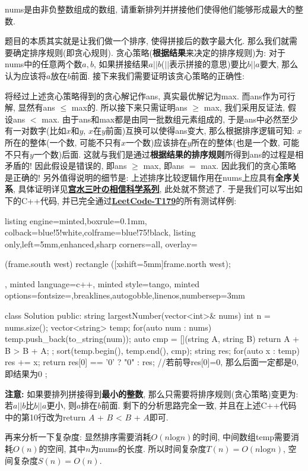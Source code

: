 \documentclass{article}
\begin{document}
\pagebreak


\begin{homeworkProblem}
    nums是由非负整数组成的数组, 请重新排列并拼接他们使得他们能够形成最大的整数.

    \solution 题目的本质其实就是让我们做一个排序, 使得拼接后的数字最大化. 那么我们就需要确定排序规则(即贪心规则). 贪心策略(\textbf{根据结果}来决定的排序规则)为: 对于nums中的任意两个数$a,b$, 如果拼接结果$a||b$($||$表示拼接的意思)要比$b||a$要大, 那么认为应该将$a$放在$b$前面. 接下来我们需要证明该贪心策略的正确性:

    将经过上述贪心策略得到的贪心解记作ans, 真实最优解记为max. 而ans作为可行解, 显然有ans $\leq $ max的. 所以接下来只需证明ans $\geq $ max, 我们采用反证法, 假设ans $<$ max. 由于ans和max都是由同一批数组元素组成的, 于是ans中必然至少有一对数字(比如$x$和$y$, $x$在$y$前面)互换可以使得ans变大, 那么根据排序逻辑可知: $x$所在的整体(一个数, 可能不只有$x$一个数)应该排在$y$所在的整体(也是一个数, 可能不只有$y$一个数)后面. 这就与我们是通过\textbf{根据结果的排序规则}所得到ans的过程是相矛盾的! 因此假设是错误的, 即ans $\geq $ max, 即ans $ = $ max. 因此我们的贪心策略是正确的! 另外值得说明的细节是: 上述排序比较逻辑作用在nums上应具有\textbf{全序关系}, 具体证明详见\href{https://leetcode.cn/problems/largest-number/solution/gong-shui-san-xie-noxiang-xin-ke-xue-xi-vn86e/}{\textbf{宫水三叶の相信科学系列}}, 此处就不赘述了. 于是我们可以写出如下的C++代码, 并已完全通过\href{https://leetcode.cn/problems/largest-number/description/}{\textbf{LeetCode-T179}}的所有测试样例:
\begin{tcblisting}{listing engine=minted,boxrule=0.1mm,
colback=blue!5!white,colframe=blue!75!black,
listing only,left=5mm,enhanced,sharp corners=all,
overlay={\begin{tcbclipinterior} (frame.south west)
rectangle ([xshift=5mm]frame.north west);\end{tcbclipinterior}},
minted language=c++,
minted style=tango,
minted options={fontsize=\small,breaklines,autogobble,linenos,numbersep=3mm}}
class Solution {
public:
    string largestNumber(vector<int>& nums) {
        int n = nums.size();
        vector<string> temp;
        for(auto num : nums) {
            temp.push_back(to_string(num));
        }
        auto cmp = [](string A, string B){
            return A + B > B + A;
        };
        sort(temp.begin(), temp.end(), cmp);
        string res;
        for(auto x : temp) {
            res += x;
        }
        return res[0] == '0' ? "0" : res; //若前导res[0]=0, 那么后面一定都是0, 即结果为0
    }
};
\end{tcblisting}
    \textbf{注意:} 如果要排列拼接得到\textbf{最小的整数}, 那么只需要将排序规则(贪心策略)变更为: 若$a||b$比$b||a$更小, 则$a$排在$b$前面. 剩下的分析思路完全一致, 并且在上述C++代码中的第10行改为return $A$ + $B$ < $B$ + $A$即可.

    再来分析一下复杂度: 显然排序需要消耗$O(n\text{log} n)$的时间, 中间数组temp需要消耗$O(n)$的空间, 其中$n$为nums的长度. 所以时间复杂度$T(n)=O(n\text{log} n)$, 空间复杂度$S(n)=O(n)$.
\end{homeworkProblem}
\end{document}
